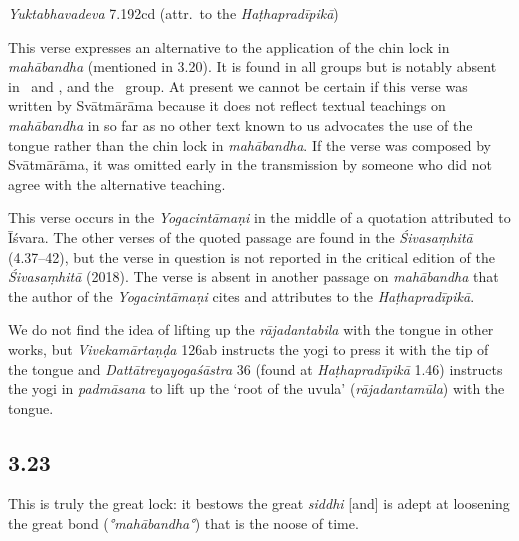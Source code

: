 \begin{ekdosis}
\begin{testimonia}[hp03_022]
\emph{Yuktabhavadeva} 7.192cd (attr.~to the \emph{Haṭhapradīpikā})
\begin{versinnote}
\end{versinnote}
\end{testimonia}

\begin{philcomm}[hp03_022]
This verse expresses an alternative to the application of the chin lock in \emph{mahā\-bandha} (mentioned in 3.20). It is found in all groups but is notably absent in \alphaOne\ and \alphaTwo, and the \textbeta\ group. At present we cannot be certain if this verse was written by Svātmārāma because it does not reflect textual teachings on \emph{mahābandha} in so far as no other text known to us advocates the use of the tongue rather than the chin lock in \emph{mahābandha}. If the verse was composed by Svātmārāma, it was omitted early in the transmission by someone who did not agree with the alternative teaching.

This verse occurs in the \emph{Yogacintāmaṇi} in the middle of a quotation attributed to Īśvara. The other verses of the quoted passage are found in the \emph{Śivasaṃhitā} (4.37–42), but the verse in question is not reported in the critical edition of the \emph{Śivasaṃhitā} (2018). The verse is absent in another passage on \emph{mahābandha} that the author of the \emph{Yogacintāmaṇi} cites and attributes to the \emph{Haṭhapradīpikā}.

We do not find the idea of lifting up the \emph{rājadantabila} with the tongue in other works, but \emph{Vivekamārtaṇḍa} 126ab instructs the yogi to press it with the tip of the tongue and \emph{Dattātreyayogaśāstra} 36 (found at \emph{Haṭhapradīpikā} 1.46) instructs the yogi in \emph{padmāsana} to lift up the `root of the uvula' (\emph{rājadantamūla}) with the tongue.
\end{philcomm}

\subsection*{3.23}
\begin{translation}[hp03_023]
This is truly the great lock: it bestows the great \emph{siddhi} [and] is adept at loosening the great bond (\emph{°mahābandha°}) that is the noose of time.
\end{translation}



\end{ekdosis}
